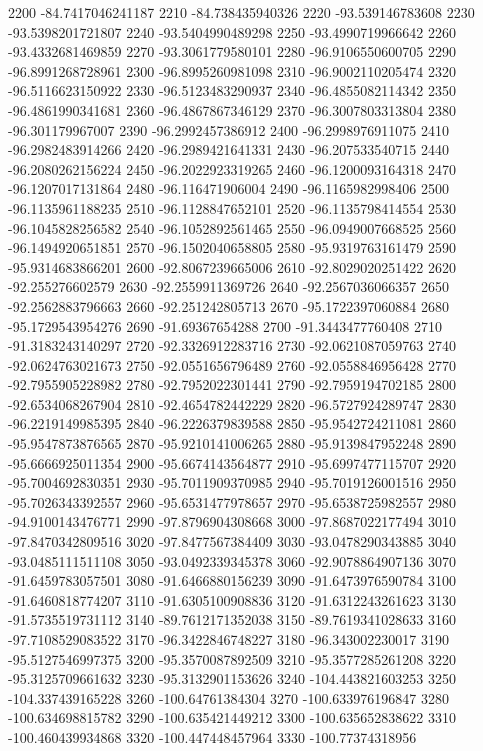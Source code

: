 {2200 -84.7417046241187
2210 -84.738435940326
2220 -93.539146783608
2230 -93.5398201721807
2240 -93.5404990489298
2250 -93.4990719966642
2260 -93.4332681469859
2270 -93.3061779580101
2280 -96.9106550600705
2290 -96.8991268728961
2300 -96.8995260981098
2310 -96.9002110205474
2320 -96.5116623150922
2330 -96.5123483290937
2340 -96.4855082114342
2350 -96.4861990341681
2360 -96.4867867346129
2370 -96.3007803313804
2380 -96.301179967007
2390 -96.2992457386912
2400 -96.2998976911075
2410 -96.2982483914266
2420 -96.2989421641331
2430 -96.207533540715
2440 -96.2080262156224
2450 -96.2022923319265
2460 -96.1200093164318
2470 -96.1207017131864
2480 -96.116471906004
2490 -96.1165982998406
2500 -96.1135961188235
2510 -96.1128847652101
2520 -96.1135798414554
2530 -96.1045828256582
2540 -96.1052892561465
2550 -96.0949007668525
2560 -96.1494920651851
2570 -96.1502040658805
2580 -95.9319763161479
2590 -95.9314683866201
2600 -92.8067239665006
2610 -92.8029020251422
2620 -92.255276602579
2630 -92.2559911369726
2640 -92.2567036066357
2650 -92.2562883796663
2660 -92.251242805713
2670 -95.1722397060884
2680 -95.1729543954276
2690 -91.69367654288
2700 -91.3443477760408
2710 -91.3183243140297
2720 -92.3326912283716
2730 -92.0621087059763
2740 -92.0624763021673
2750 -92.0551656796489
2760 -92.0558846956428
2770 -92.7955905228982
2780 -92.7952022301441
2790 -92.7959194702185
2800 -92.6534068267904
2810 -92.4654782442229
2820 -96.5727924289747
2830 -96.2219149985395
2840 -96.2226379839588
2850 -95.9542724211081
2860 -95.9547873876565
2870 -95.9210141006265
2880 -95.9139847952248
2890 -95.6666925011354
2900 -95.6674143564877
2910 -95.6997477115707
2920 -95.7004692830351
2930 -95.7011909370985
2940 -95.7019126001516
2950 -95.7026343392557
2960 -95.6531477978657
2970 -95.6538725982557
2980 -94.9100143476771
2990 -97.8796904308668
3000 -97.8687022177494
3010 -97.8470342809516
3020 -97.8477567384409
3030 -93.0478290343885
3040 -93.0485111511108
3050 -93.0492339345378
3060 -92.9078864907136
3070 -91.6459783057501
3080 -91.6466880156239
3090 -91.6473976590784
3100 -91.6460818774207
3110 -91.6305100908836
3120 -91.6312243261623
3130 -91.5735519731112
3140 -89.7612171352038
3150 -89.7619341028633
3160 -97.7108529083522
3170 -96.3422846748227
3180 -96.343002230017
3190 -95.5127546997375
3200 -95.3570087892509
3210 -95.3577285261208
3220 -95.3125709661632
3230 -95.3132901153626
3240 -104.443821603253
3250 -104.337439165228
3260 -100.64761384304
3270 -100.633976196847
3280 -100.634698815782
3290 -100.635421449212
3300 -100.635652838622
3310 -100.460439934868
3320 -100.447448457964
3330 -100.77374318956
}
